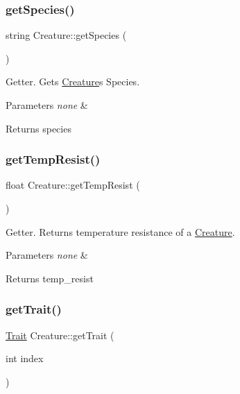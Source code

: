\subsubsection{\texorpdfstring{get\+Species()}{getSpecies()}}
{\footnotesize\ttfamily string Creature\+::get\+Species (\begin{DoxyParamCaption}{ }\end{DoxyParamCaption})}

Getter. Gets \hyperlink{class_creature}{Creature}\textquotesingle{}s Species. 
\begin{DoxyParams}{Parameters}
{\em none} & \\
\hline
\end{DoxyParams}
\begin{DoxyReturn}{Returns}
species 
\end{DoxyReturn}
\mbox{\label{class_creature_af2d9ed47b9f8c4baebf8be7f1a6c7c16}} 
\subsubsection{\texorpdfstring{get\+Temp\+Resist()}{getTempResist()}}
{\footnotesize\ttfamily float Creature\+::get\+Temp\+Resist (\begin{DoxyParamCaption}{ }\end{DoxyParamCaption})}

Getter. Returns temperature resistance of a \hyperlink{class_creature}{Creature}. 
\begin{DoxyParams}{Parameters}
{\em none} & \\
\hline
\end{DoxyParams}
\begin{DoxyReturn}{Returns}
temp\+\_\+resist 
\end{DoxyReturn}
\mbox{\label{class_creature_a5cbb05e4ed97cefab203ce1d0a639663}} 
\subsubsection{\texorpdfstring{get\+Trait()}{getTrait()}}
{\footnotesize\ttfamily \hyperlink{class_trait}{Trait} Creature\+::get\+Trait (\begin{DoxyParamCaption}\item[{int}]{index }\end{DoxyParamCaption})}

